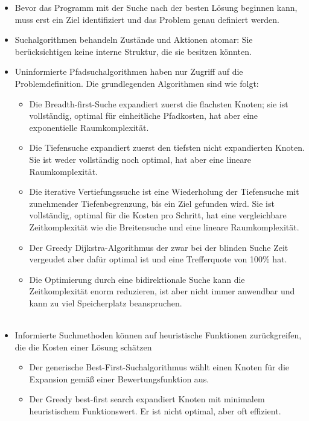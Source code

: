 \begin{itemize}
    \item Bevor das Programm mit der Suche nach der besten Lösung beginnen kann, muss erst ein Ziel identifiziert und das Problem genau definiert werden.
    \item Suchalgorithmen behandeln Zustände und Aktionen atomar: Sie berücksichtigen keine interne Struktur, die sie besitzen könnten.
    \item Uninformierte Pfadsuchalgorithmen haben nur Zugriff auf die Problemdefinition. Die grundlegenden Algorithmen sind wie folgt:
    \begin{itemize}
        \item Die Breadth-first-Suche expandiert zuerst die flachsten Knoten; sie ist vollständig, optimal für einheitliche Pfadkosten, hat aber eine exponentielle Raumkomplexität.
        \item Die Tiefensuche expandiert zuerst den tiefsten nicht expandierten Knoten. Sie ist weder vollständig noch optimal, hat aber eine lineare Raumkomplexität.
        \item Die iterative Vertiefungssuche ist eine Wiederholung der Tiefensuche mit zunehmender Tiefenbegrenzung, bis ein Ziel gefunden wird. Sie ist vollständig, optimal für die Kosten pro Schritt, hat eine vergleichbare Zeitkomplexität wie die Breitensuche und eine lineare Raumkomplexität.
        \item Der Greedy Dijkstra-Algorithmus der zwar bei der blinden Suche Zeit vergeudet aber dafür optimal ist und eine Trefferquote von 100\% hat.
        \item Die Optimierung durch eine bidirektionale Suche kann die Zeitkomplexität enorm reduzieren, ist aber nicht immer anwendbar und kann zu viel Speicherplatz beanspruchen.\\\\
    \end{itemize}
    \item Informierte Suchmethoden können auf heuristische Funktionen zurückgreifen, die die Kosten einer Lösung schätzen
    \begin{itemize}
        \item Der generische Best-First-Suchalgorithmus wählt einen Knoten für die Expansion gemäß einer Bewertungsfunktion aus.
        \item Der Greedy best-first search expandiert Knoten mit minimalem heuristischem Funktionswert. Er ist nicht optimal, aber oft effizient.

\end{itemize}
\end{itemize}
